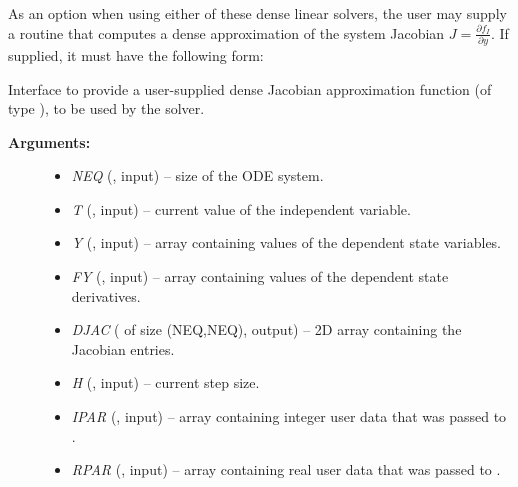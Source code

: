 \documentclass[letterpaper,10pt,english]{sphinxmanual}
\begin{document}
As an option when using either of these dense linear solvers, the user
may supply a routine that computes a dense approximation of the system
Jacobian \(J = \frac{\partial f_I}{\partial y}\).  If supplied, it
must have the following form:

\begin{fulllineitems}
\label{f_interface/Usage:f/_/FARKDJAC}
Interface to provide a user-supplied dense Jacobian approximation
function (of type {\hyperref[c_interface/User_supplied:c.ARKDlsDenseJacFn]{\emph{}}}), to be used by the
{\hyperref[f_interface/Usage:f/_/FARKDENSE]{\emph{}}} solver.
\begin{description}
\item[{\textbf{Arguments:}}] \leavevmode\begin{itemize}
\item {} 
\emph{NEQ} (, input) -- size of the ODE system.

\item {} 
\emph{T} (, input) -- current value of the independent variable.

\item {} 
\emph{Y} (, input) -- array containing values of the dependent state variables.

\item {} 
\emph{FY} (, input) -- array containing values of the dependent state derivatives.

\item {} 
\emph{DJAC} ( of size (NEQ,NEQ), output) -- 2D array containing the Jacobian entries.

\item {} 
\emph{H} (, input) -- current step size.

\item {} 
\emph{IPAR} (, input) -- array containing integer user data that was passed to
{\hyperref[f_interface/Usage:f/_/FARKMALLOC]{\emph{}}}.

\item {} 
\emph{RPAR} (, input) -- array containing real user data that was passed to
{\hyperref[f_interface/Usage:f/_/FARKMALLOC]{\emph{}}}.


\end{itemize}
\end{description}
\end{fulllineitems}
\end{document}
